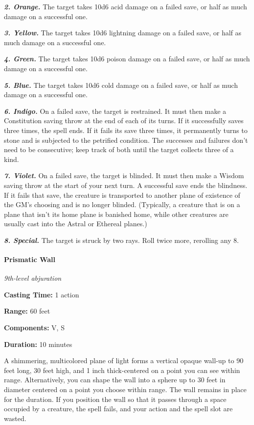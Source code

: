 \documentclass[
]{article}
\begin{document}
\emph{\textbf{2. Orange.}} The target takes 10d6 acid damage on a failed
save, or half as much damage on a successful one.

\emph{\textbf{3. Yellow.}} The target takes 10d6 lightning damage on a
failed save, or half as much damage on a successful one.

\emph{\textbf{4. Green.}} The target takes 10d6 poison damage on a
failed save, or half as much damage on a successful one.

\emph{\textbf{5. Blue.}} The target takes 10d6 cold damage on a failed
save, or half as much damage on a successful one.

\emph{\textbf{6. Indigo.}} On a failed save, the target is restrained.
It must then make a Constitution saving throw at the end of each of its
turns. If it successfully saves three times, the spell ends. If it fails
its save three times, it permanently turns to stone and is subjected to
the petrified condition. The successes and failures don't need to be
consecutive; keep track of both until the target collects three of a
kind.

\emph{\textbf{7. Violet.}} On a failed save, the target is blinded. It
must then make a Wisdom saving throw at the start of your next turn. A
successful save ends the blindness. If it fails that save, the creature
is transported to another plane of existence of the GM's choosing and is
no longer blinded. (Typically, a creature that is on a plane that isn't
its home plane is banished home, while other creatures are usually cast
into the Astral or Ethereal planes.)

\emph{\textbf{8. Special.}} The target is struck by two rays. Roll twice
more, rerolling any 8.

\hypertarget{prismatic-wall}{%
\paragraph{Prismatic Wall}\label{prismatic-wall}}

\emph{9th-level abjuration}

\textbf{Casting Time:} 1 action

\textbf{Range:} 60 feet

\textbf{Components:} V, S

\textbf{Duration:} 10 minutes

A shimmering, multicolored plane of light forms a vertical opaque
wall-up to 90 feet long, 30 feet high, and 1 inch thick-centered on a
point you can see within range. Alternatively, you can shape the wall
into a sphere up to 30 feet in diameter centered on a point you choose
within range. The wall remains in place for the duration. If you
position the wall so that it passes through a space occupied by a
creature, the spell fails, and your action and the spell slot are
wasted.
\end{document}
